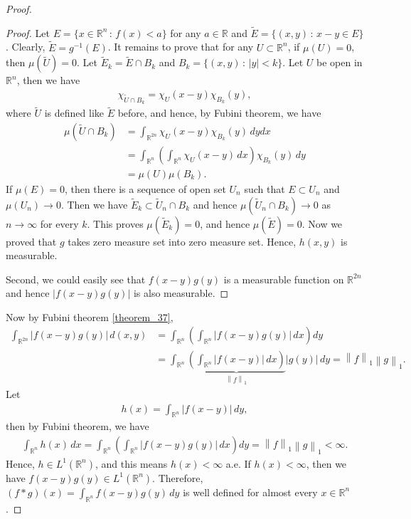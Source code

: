 \documentclass[11pt]{book}
\theoremstyle{definition}
\numberwithin{equation}{chapter}
\begin{document}
\begin{proof}
\begin{proof}
Let $E = \{x \in \mathbb{R}^n \,:\, f(x) < a\}$ for any $a \in \mathbb{R}$ and $\widetilde{E} = \{(x,y) \,:\, x - y \in E\}$. Clearly, $\widetilde{E} = g^{-1}(E)$. It remains to prove that for any $U \subset \mathbb{R}^n$, if $\mu(U) = 0$, then $\mu(\widetilde{U}) = 0$. Let $\widetilde{E}_k = \widetilde{E} \cap B_k$ and $B_k = \{(x,y) \,:\, \left|y\right| < k\}$. Let $U$ be open in $\mathbb{R}^n$, then we have
\begin{align*}
    \chi_{\widetilde{U} \cap B_k} = \chi_{U}(x-y) \chi_{B_k}(y),
\end{align*}
where $\widetilde{U}$ is defined like $\widetilde{E}$ before, and hence, by Fubini theorem, we have
\begin{align*}
    \mu\left(\widetilde{U} \cap B_k\right) & = \int_{\mathbb{R}^{2n}} \chi_{U}(x-y) \chi_{B_k}(y) \,dy dx \\
    & = \int_{\mathbb{R}^{n}} \left(\int_{\mathbb{R}^{n}} \chi_{U}(x-y) \,dx\right) \chi_{B_k}(y) \,dy \\
    & = \mu(U) \mu(B_k).
\end{align*}
If $\mu(E) = 0$, then there is a sequence of open set $U_n$ such that $E \subset U_n$ and $\mu(U_n) \to 0$. Then we have $\widetilde{E}_k \subset \widetilde{U}_n \cap B_k$  and hence $\mu(\widetilde{U}_n \cap B_k) \to 0$ as $n \to \infty$ for every $k$. This proves $\mu(\widetilde{E}_k) = 0$, and hence $\mu(\widetilde{E}) = 0$. Now we proved that $g$ takes zero measure set into zero measure set. Hence, $h(x,y)$ is measurable.

Second, we could easily see that $f(x-y)g(y)$ is a measurable function on $\mathbb{R}^{2n}$ and hence $\left|f(x-y)g(y)\right|$ is also measurable.
\end{proof}

\medskip

Now by Fubini theorem \ref{theorem_37},
\begin{align*}
    \int_{\mathbb{R}^{2n}} \left|f(x-y)g(y)\right| \, d(x,y) & = \int_{\mathbb{R}^n} \left(\int_{\mathbb{R}^n} \left|f(x-y)g(y)\right|\, dx\right) dy \\
    & = \int_{\mathbb{R}^n} \underbrace{\left(\int_{\mathbb{R}^n} \left|f(x-y)\right|\,dx \right)}_{\left\|f\right\|_1}  \left|g(y)\right|\, dy = \left\|f\right\|_1 \left\|g\right\|_1.
\end{align*}
Let
\begin{align*}
    h(x) = \int_{\mathbb{R}^n} \left|f(x-y)\right|\,dy,
\end{align*}
then by Fubini theorem, we have
\begin{align*}
    \int_{\mathbb{R}^n} h(x) \,dx = \int_{\mathbb{R}^n} \left(\int_{\mathbb{R}^n} \left|f(x-y)g(y)\right|\, dx\right) dy = \left\|f\right\|_1 \left\|g\right\|_1 < \infty.
\end{align*}
Hence, $h \in L^1(\mathbb{R}^n)$, and this means $h(x) < \infty$ a.e. If $h(x) < \infty$, then we have $f(x - y)g(y) \in L^1(\mathbb{R}^n)$. Therefore, $(f*g)(x) = \int_{\mathbb{R}^n} f(x - y)g(y)\,dy$ is well defined for almost every $x \in \mathbb{R}^n$.


\end{proof}
\end{document}
